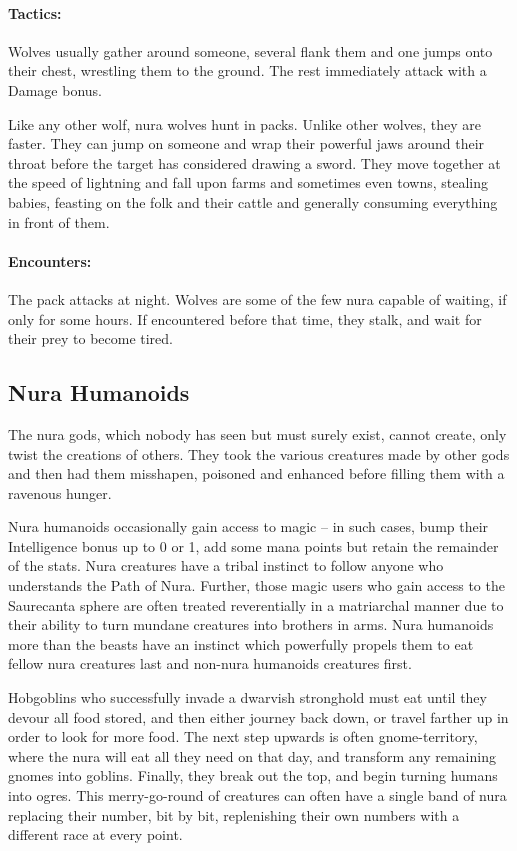 \begin{multicols}{2}
\label{nura_wolf}

\paragraph{Tactics:} Wolves usually gather around someone, several flank them and one jumps onto their chest, wrestling them to the ground.
The rest immediately attack with a Damage bonus.

Like any other wolf, nura wolves hunt in packs.
Unlike other wolves, they are faster.
They can jump on someone and wrap their powerful jaws around their throat before the target has considered drawing a sword.
They move together at the speed of lightning and fall upon farms and sometimes even towns, stealing babies, feasting on the folk and their cattle and generally consuming everything in front of them.

\paragraph{Encounters:} The pack attacks at night.
Wolves are some of the few nura capable of waiting, if only for some hours.
If encountered before that time, they stalk, and wait for their prey to become tired.


\subsection{Nura Humanoids}

The nura gods, which nobody has seen but must surely exist, cannot create, only twist the creations of others.  They took the various creatures made by other gods and then had them misshapen, poisoned and enhanced before filling them with a ravenous hunger.

Nura humanoids occasionally gain access to magic -- in such cases, bump their Intelligence bonus up to 0 or 1, add some mana points but retain the remainder of the stats.
Nura creatures have a tribal instinct to follow anyone who understands the Path of Nura.
Further, those magic users who gain access to the Saurecanta sphere are often treated reverentially in a matriarchal manner due to their ability to turn mundane creatures into brothers in arms.
Nura humanoids more than the beasts have an instinct which powerfully propels them to eat fellow nura creatures last and non-nura humanoids creatures first.

Hobgoblins who successfully invade a dwarvish stronghold must eat until they devour all food stored, and then either journey back down, or travel farther up in order to look for more food.
The next step upwards is often gnome-territory, where the nura will eat all they need on that day, and transform any remaining gnomes into goblins.
Finally, they break out the top, and begin turning humans into ogres.
This merry-go-round of creatures can often have a single band of nura replacing their number, bit by bit, replenishing their own numbers with a different race at every point.


\end{multicols}
